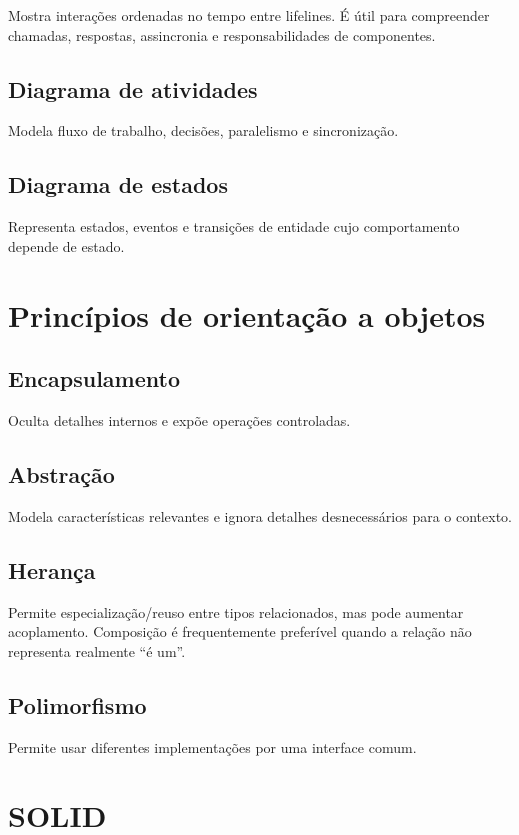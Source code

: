 Mostra interações ordenadas no tempo entre lifelines. É útil para compreender chamadas, respostas, assincronia e responsabilidades de componentes.

\subsection{Diagrama de atividades}

Modela fluxo de trabalho, decisões, paralelismo e sincronização.

\subsection{Diagrama de estados}

Representa estados, eventos e transições de entidade cujo comportamento depende de estado.

\section{Princípios de orientação a objetos}

\subsection{Encapsulamento}

Oculta detalhes internos e expõe operações controladas.

\subsection{Abstração}

Modela características relevantes e ignora detalhes desnecessários para o contexto.

\subsection{Herança}

Permite especialização/reuso entre tipos relacionados, mas pode aumentar acoplamento. Composição é frequentemente preferível quando a relação não representa realmente ``é um''.

\subsection{Polimorfismo}

Permite usar diferentes implementações por uma interface comum.

\section{SOLID}

